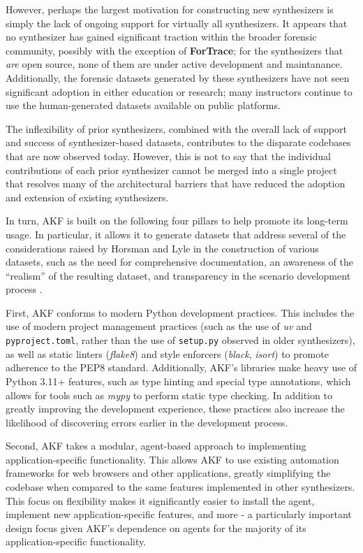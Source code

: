 \documentclass[letterpaper,12pt]{report}
\begin{document}
However, perhaps the largest motivation for constructing new
synthesizers is simply the lack of ongoing support for virtually all
synthesizers. It appears that no synthesizer has gained significant
traction within the broader forensic community, possibly with the
exception of \textbf{ForTrace}; for the synthesizers that \emph{are}
open source, none of them are under active development and maintanance.
Additionally, the forensic datasets generated by these synthesizers have
not seen significant adoption in either education or research; many
instructors continue to use the human-generated datasets available on
public platforms.

The inflexibility of prior synthesizers, combined with the overall lack
of support and success of synthesizer-based datasets, contributes to the
disparate codebases that are now observed today. However, this is not to
say that the individual contributions of each prior synthesizer cannot
be merged into a single project that resolves many of the architectural
barriers that have reduced the adoption and extension of existing
synthesizers.

In turn, AKF is built on the following four pillars to help promote its
long-term usage. In particular, it allows it to generate datasets that
address several of the considerations raised by Horsman and Lyle in the
construction of various datasets, such as the need for comprehensive
documentation, an awareness of the ``realism'' of the resulting dataset,
and transparency in the scenario development process
\cite{horsmanDatasetConstructionChallenges2021}.

First, AKF conforms to modern Python development practices. This
includes the use of modern project management practices (such as the use
of \emph{uv} and \texttt{pyproject.toml}, rather than the use of
\texttt{setup.py} observed in older synthesizers), as well as static
linters (\emph{flake8}) and style enforcers (\emph{black}, \emph{isort})
to promote adherence to the PEP8 standard. Additionally, AKF's libraries
make heavy use of Python 3.11+ features, such as type hinting and
special type annotations, which allows for tools such as \emph{mypy} to
perform static type checking. In addition to greatly improving the
development experience, these practices also increase the likelihood of
discovering errors earlier in the development process.

Second, AKF takes a modular, agent-based approach to implementing
application-specific functionality. This allows AKF to use existing
automation frameworks for web browsers and other applications, greatly
simplifying the codebase when compared to the same features implemented
in other synthesizers. This focus on flexibility makes it significantly
easier to install the agent, implement new application-specific
features, and more - a particularly important design focus given AKF's
dependence on agents for the majority of its application-specific
functionality.
\end{document}
